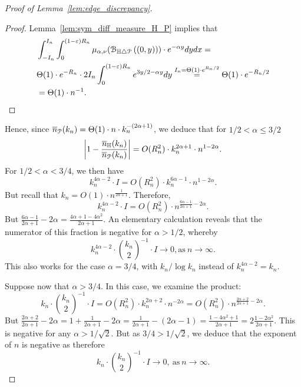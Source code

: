 \begin{proof}[Proof of Lemma~\ref{lem:edge_discrepancy}]
\begin{proof}
Lemma~\ref{lem:sym_diff_measure_H_P} implies that 
\begin{equation*}
\begin{split}
&\int_{-I_n}^{I_n} \int_0^{(1-\varepsilon) R_n} \mu_{\alpha, \nu} ({\mathcal B}_{\mathbb{H} \bigtriangleup {\mathcal P}}\left((0,y)\right))\cdot 
e^{-\alpha y} dy dx  = \\
& \Theta (1) \cdot e^{- R_n} \cdot 2 I_n \int_0^{(1-\varepsilon)R_n} 
e^{3y/2 -\alpha y} dy \stackrel{I_n = \Theta(1) \cdot e^{R_n/2}}{=} 
\Theta (1) \cdot e^{-R_n/2}\\
&= \Theta (1) \cdot n^{-1}. 
\end{split}
\end{equation*}
\end{proof}
Hence, since $\overline{n}_{{\mathcal P}}(k_n) = \Theta(1) \cdot n \cdot k_n^{-(2\alpha+1)}$, we deduce that for 
$1/2 <\alpha \leq 3/2$ 
$$  \left| 1 - \frac{\overline{n}_{\mathbb{H}}(k_n)}{\overline{n}_{{\mathcal P}}(k_n)} \right| =O(R_n^2) \cdot k_n^{2\alpha +1} \cdot n^{1-2\alpha}. $$ 
For $1/2 < \alpha < 3/4$, we then have 
$$ k_n^{4\alpha -2} \cdot I = O(R_n^2) \cdot k_n^{6\alpha -1} \cdot n^{1-2\alpha}.$$
But recall that $k_n = O(1) \cdot n^{\frac{1}{2\alpha +1}}$. 
Therefore,
$$ k_n^{4\alpha -2} \cdot I = O(R_n^2) \cdot n^{\frac{6\alpha-1}{2\alpha +1} - 2\alpha}.$$
But $\frac{6\alpha-1}{2\alpha +1} - 2\alpha = \frac{4\alpha +1  -4\alpha^2}{2\alpha+1}$. An elementary calculation reveals that the numerator of this fraction is negative for $\alpha >1/2$, whereby 
$$ k_n^{4\alpha -2} \cdot {k_n \choose 2}^{-1} \cdot I \to 0, \mbox{as} \ n \to \infty. $$
This also works for the case $\alpha = 3/4$, with $k_n /\log k_n$ instead of $k_n^{4\alpha -2} =k_n$.

Suppose now that $\alpha > 3/4$. In this case, we examine the product: 
$$ k_n  \cdot {k_n \choose 2}^{-1} \cdot  I = O(R_n^2) \cdot k_n^{2\alpha +2} \cdot n^{-2\alpha} = 
O(R_n^2) \cdot n^{\frac{2\alpha + 2}{2\alpha +1}-2\alpha}.
$$
But $\frac{2\alpha + 2}{2\alpha +1}-2\alpha = 1 + \frac{1}{2\alpha +1} - 2\alpha 
= \frac{1}{2\alpha +1} - (2\alpha -1) = \frac{1 - 4 \alpha^2 +1}{2\alpha +1} = 
2\frac{1-2\alpha^2}{2\alpha +1}$. This is negative for any $\alpha > 1/\sqrt{2}$. 
But as $3/4 > 1/\sqrt{2}$, we deduce that the exponent of $n$ is negative as therefore 
$$ k_n  \cdot {k_n \choose 2}^{-1}\cdot  I \to 0, \ \mbox{as} \ n \to \infty. $$


\end{proof}
